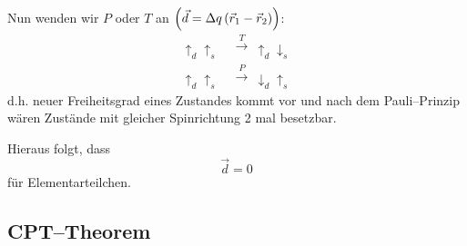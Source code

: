 \documentclass[Ex4_Zusammenfassung.tex]{subfiles}
\begin{document}
Nun wenden wir $P$ oder $T$ an $\left( \vec{d} = \Delta q \left( \vec{r}_1 - \vec{r}_2 \right) \right)$:
\begin{align}
	\uparrow_d \uparrow_s\ &\stackrel{T}{\rightarrow}\ \uparrow_d \downarrow_s \\
	\uparrow_d \uparrow_s\ &\stackrel{P}{\rightarrow}\ \downarrow_d \uparrow_s
\end{align}
d.h. neuer Freiheitsgrad eines Zustandes kommt vor und nach dem Pauli--Prinzip wären Zustände mit gleicher Spinrichtung 2 mal besetzbar. \Lightning

Hieraus folgt, dass 
\begin{equation}
	\vec{d} = 0
\end{equation}
für Elementarteilchen.

\subsection{CPT--Theorem}
\end{document}

